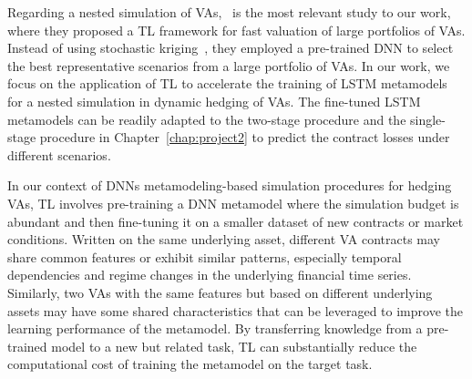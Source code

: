 Regarding a nested simulation of VAs,~\cite{cheng2019fast} is the most relevant study to our work, where they proposed a TL framework for fast valuation of large portfolios of VAs.
Instead of using stochastic kriging~\citep{gan2015valuation}, they employed a pre-trained DNN to select the best representative scenarios from a large portfolio of VAs.
In our work, we focus on the application of TL to accelerate the training of LSTM metamodels for a nested simulation in dynamic hedging of VAs.
The fine-tuned LSTM metamodels can be readily adapted to the two-stage procedure and the single-stage procedure in Chapter~\ref{chap:project2} to predict the contract losses under different scenarios.

In our context of DNNs metamodeling-based simulation procedures for hedging VAs, TL involves pre-training a DNN metamodel where the simulation budget is abundant and then fine-tuning it on a smaller dataset of new contracts or market conditions.
Written on the same underlying asset, different VA contracts may share common features or exhibit similar patterns, especially temporal dependencies and regime changes in the underlying financial time series.
Similarly, two VAs with the same features but based on different underlying assets may have some shared characteristics that can be leveraged to improve the learning performance of the metamodel.
By transferring knowledge from a pre-trained model to a new but related task, TL can substantially reduce the computational cost of training the metamodel on the target task.

